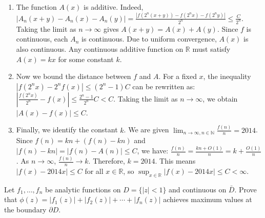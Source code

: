 \begin{solution}
\begin{enumerate}
    \item The function $A(x)$ is additive. Indeed,
    $|A_n(x+y) - A_n(x) - A_n(y)| = \frac{|f(2^n(x+y)) - f(2^n x) - f(2^n y)|}{2^n} \leq \frac{C}{2^n}$.
    Taking the limit as $n \to \infty$ gives $A(x+y) = A(x) + A(y)$.
    Since $f$ is continuous, each $A_n$ is continuous. Due to uniform convergence, $A(x)$ is also continuous. Any continuous additive function on $\mathbb{R}$ must satisfy $A(x) = kx$ for some constant $k$.

    \item Now we bound the distance between $f$ and $A$. For a fixed $x$, the inequality $|f(2^n x) - 2^n f(x)| \leq (2^n-1)C$ can be rewritten as:
    $\left| \frac{f(2^n x)}{2^n} - f(x) \right| \leq \frac{2^n-1}{2^n} C < C$.
    Taking the limit as $n \to \infty$, we obtain $|A(x) - f(x)| \leq C$.

    \item Finally, we identify the constant $k$. We are given $\lim_{n \to \infty, n \in \mathbb{N}} \frac{f(n)}{n} = 2014$.
    Since $f(n) = kn + (f(n) - kn)$ and $|f(n) - kn| = |f(n) - A(n)| \leq C$, we have:
    $\frac{f(n)}{n} = \frac{kn + O(1)}{n} = k + \frac{O(1)}{n}$.
    As $n \to \infty$, $\frac{f(n)}{n} \to k$. Therefore, $k = 2014$.
    This means $|f(x) - 2014x| \leq C$ for all $x \in \mathbb{R}$, so $\sup_{x \in \mathbb{R}} |f(x) - 2014x| \leq C < \infty$.
\end{enumerate}
\end{solution}

\begin{exercise}
\label{analysis:2014:2}
Let $f_1,\dots,f_n$ be analytic functions on $D=\{|z|<1\}$ and continuous on $\bar{D}$. Prove that $\phi(z)=|f_1(z)|+|f_2(z)|+\cdots+|f_n(z)|$ achieves maximum values at the boundary $\partial D$.
\end{exercise}

